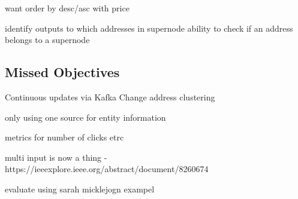 want order by desc/asc with price

identify outputs to which addresses in supernode
ability to check if an address belongs to a supernode 


\subsection{Missed Objectives}
Continuous updates via Kafka
Change address clustering


only using one source for entity information 

metrics for number of clicks etrc


multi input is now a thing - https://ieeexplore.ieee.org/abstract/document/8260674

evaluate using sarah micklejogn exampel 

